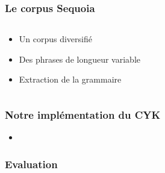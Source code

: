\documentclass{beamer}
\begin{document}

\begin{frame}
  \frametitle{Le corpus Sequoia}
  \begin{columns}
  \begin{column}{0.5\textwidth}
    \begin{itemize}
     \item{ Un corpus diversifié}
     \item{ Des phrases de longueur variable}
     \item{ Extraction de la grammaire}
     
     
    \end{itemize}
   
  \end{column}
  

  \end{columns}

\end{frame}

\begin{frame}
\frametitle{Notre implémentation du CYK}

\begin{itemize}
 \item{}
\end{itemize}


 
\end{frame}

\begin{frame}
\frametitle{Evaluation}

\end{frame}
\end{document}
